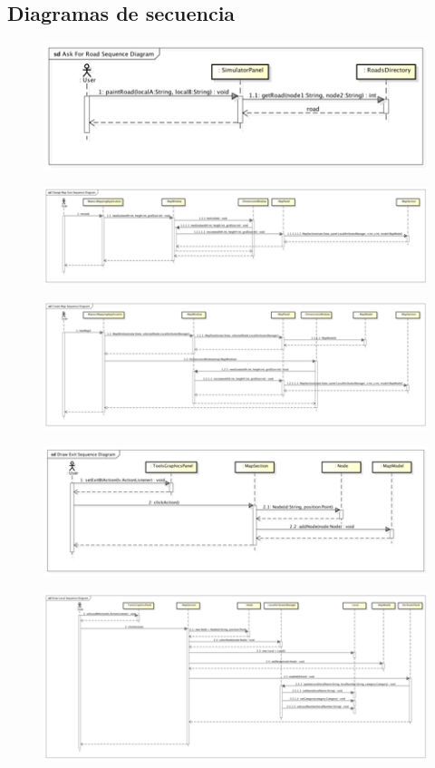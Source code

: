\documentclass[11pt]{book}
\begin{document}
\subsection{Diagramas de secuencia}
\begin{figure}[H]
  \centering
    \includegraphics[scale=1]{secuencia1}
\end{figure}
\begin{figure}[H]
  \centering
    \includegraphics[scale=1]{secuencia2}
\end{figure}
\begin{figure}[H]
  \centering
    \includegraphics[scale=1]{secuencia3}
\end{figure}
\begin{figure}[H]
  \centering
    \includegraphics[scale=1]{secuencia4}
\end{figure}
\begin{figure}[H]
  \centering
    \includegraphics[scale=1]{secuencia5}
\end{figure}
\end{document}

